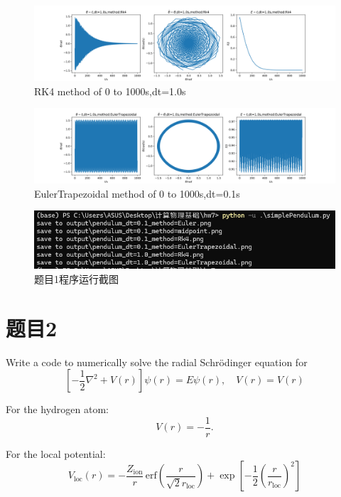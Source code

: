 \documentclass[11pt]{article}
\begin{document}
  \begin{figure}
    \centering
    \includegraphics[width=1.0\linewidth]{photo/pendulum_dt=1.0_method=Rk4.png}
    \caption{RK4 method of 0 to 1000s,dt=1.0s}
    \label{fig:5}
  \end{figure}

  \begin{figure}
    \centering
    \includegraphics[width=1.0\linewidth]{photo/pendulum_dt=1.0_method=EulerTrapezoidal.png}
    \caption{EulerTrapezoidal method of 0 to 1000s,dt=0.1s}
    \label{fig:6}
  \end{figure}

  \begin{figure}
    \centering
    \includegraphics[width=0.8\linewidth]{photo/figp1.png}
    \caption{题目1程序运行截图}
    \label{fig:6}
  \end{figure}
  
\section{题目2}
Write a code to numerically solve the radial Schrödinger equation for
\[
\left[ -\frac{1}{2} \nabla^2 + V(r) \right] \psi(r) = E \psi(r), \quad V(r) = V(r)
\]

For the hydrogen atom:
\[
V(r) = -\frac{1}{r}.
\]

For the local potential:
\[
V_{\text{loc}}(r) = -\frac{Z_{\text{ion}}}{r} \, \text{erf} \left( \frac{r}{\sqrt{2} r_{\text{loc}}} \right)
+ \exp \left[ -\frac{1}{2} \left( \frac{r}{r_{\text{loc}}} \right)^2 \right]
\]
\end{document}
